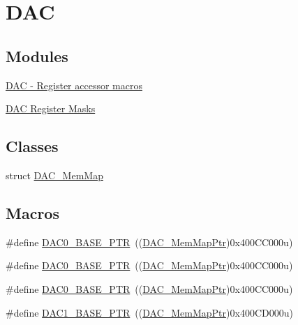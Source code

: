\hypertarget{group___d_a_c___peripheral}{}\section{D\+AC}
\label{group___d_a_c___peripheral}
\subsection*{Modules}
\begin{DoxyCompactItemize}
\item 
\hyperlink{group___d_a_c___register___accessor___macros}{D\+A\+C -\/ Register accessor macros}
\item 
\hyperlink{group___d_a_c___register___masks}{D\+A\+C Register Masks}
\end{DoxyCompactItemize}
\subsection*{Classes}
\begin{DoxyCompactItemize}
\item 
struct \hyperlink{struct_d_a_c___mem_map}{D\+A\+C\+\_\+\+Mem\+Map}
\end{DoxyCompactItemize}
\subsection*{Macros}
\begin{DoxyCompactItemize}
\item 
\#define \hyperlink{group___d_a_c___peripheral_gabe3b30df06ec04e5c899efd6e49f1800}{D\+A\+C0\+\_\+\+B\+A\+S\+E\+\_\+\+P\+TR}~((\hyperlink{group___d_a_c___peripheral_gaf4fffbe25ce148c577ec740897223a7f}{D\+A\+C\+\_\+\+Mem\+Map\+Ptr})0x400\+C\+C000u)
\item 
\#define \hyperlink{group___d_a_c___peripheral_gabe3b30df06ec04e5c899efd6e49f1800}{D\+A\+C0\+\_\+\+B\+A\+S\+E\+\_\+\+P\+TR}~((\hyperlink{group___d_a_c___peripheral_gaf4fffbe25ce148c577ec740897223a7f}{D\+A\+C\+\_\+\+Mem\+Map\+Ptr})0x400\+C\+C000u)
\item 
\#define \hyperlink{group___d_a_c___peripheral_gabe3b30df06ec04e5c899efd6e49f1800}{D\+A\+C0\+\_\+\+B\+A\+S\+E\+\_\+\+P\+TR}~((\hyperlink{group___d_a_c___peripheral_gaf4fffbe25ce148c577ec740897223a7f}{D\+A\+C\+\_\+\+Mem\+Map\+Ptr})0x400\+C\+C000u)
\item 
\#define \hyperlink{group___d_a_c___peripheral_gab3af24d21edf756c3f794c52b5789847}{D\+A\+C1\+\_\+\+B\+A\+S\+E\+\_\+\+P\+TR}~((\hyperlink{group___d_a_c___peripheral_gaf4fffbe25ce148c577ec740897223a7f}{D\+A\+C\+\_\+\+Mem\+Map\+Ptr})0x400\+C\+D000u)
\end{DoxyCompactItemize}
